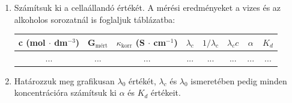 \begin{enumerate}
\item Számítsuk ki a cellaállandó értékét.
A mérési eredményeket a vizes és az alkoholos sorozatnál is foglaljuk táblázatba:

\begin{table}[!h]
\centering
\begin{tabular}{|c|c|c|c|c|c|c|c|}
\hline
c (mol $\cdot$ dm$^{-3}$) & G$_{\text{mért}}$ & $\kappa_{\text{korr}}$ (S $\cdot$ cm$^{-1}$) & $\lambda_c$ & $1/\lambda_c$ & $\lambda_c c$ & $\alpha$ & $K_d$ \\
\hline
... & ... & ... & ... & ... & ... & ... & ... \\
\end{tabular}
\label{table:vez}
\end{table}

\item Határozzuk meg grafikusan $\lambda_0$ értékét, $\lambda_c$ és $\lambda_0$ ismeretében pedig minden koncentrációra számítsuk ki $\alpha$ és $K_d$ értékeit.

\end{enumerate}



